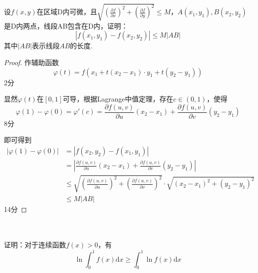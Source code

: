 \documentclass[hideanswer=false,
	enfont=newtxtext,
	zhfont=empty,
	mathfont=newtxmath,
]{cmcthesis}
\begin{document}
\\\\
设$f(x,y)$在区域D内可微，且$\sqrt{\left(\frac{\partial f}{\partial x}\right)^2+\left(\frac{\partial f}{\partial y}\right)^2}\leq M$，$A\left(x_1,y_1\right),B\left(x_2,y_2\right)$是D内两点，线段AB包含在D内，证明：
	\[
	|f\left(x_1,y_1\right)-f\left(x_2,y_2\right)|\leq M|AB|
	\]
其中$|AB|$表示线段$AB$的长度.
	\begin{answer}
	\begin{proof}
作辅助函数
	\[
	\varphi\left(t\right)=f\left(x_1+t\left(x_2-x_1\right)\cdot y_1+t\left(y_2-y_1\right)\right)
	\]
\hfill\dotfill 2分

显然$\varphi(t)$在$[0,1]$可导，根据Lagrange中值定理，存在$c\in(0,1)$，使得
	\[
	\varphi\left(1\right)-\varphi\left(0\right)=\varphi '\left(c\right)=\frac{\partial f\left(u,v\right)}{\partial u}\left(x_2-x_1\right)+\frac{\partial f\left(u,v\right)}{\partial v}\left(y_2-y_1\right)
	\]
\hfill\dotfill 8分

即可得到
\begin{align*}
	\left|\varphi\left(1\right)-\varphi\left(0\right)\right|&=\left| f\left(x_2,y_2\right)-f\left(x_1,y_1\right)\right|\\
	&=\left|\frac{\partial f\left(u,v\right)}{\partial u}\left(x_2-x_1\right)+\frac{\partial f\left(u,v\right)}{\partial v}\left(y_2-y_1\right)\right|\\
	&\leq\sqrt{\left(\frac{\partial f\left(u,v\right)}{\partial u}\right)^2+\left(\frac{\partial f\left(u,v\right)}{\partial v}\right)^2}\cdot\sqrt{\left(x_2-x_1\right)^2+\left(y_2-y_1\right)^2}\\
	&\leq M\left| AB\right|
\end{align*}
\hfill\dotfill 14分
	\end{proof}
	\end{answer}




\\\\
证明：对于连续函数$f(x)>0$，有
	\[
	\ln\int_0^1{f\left(x\right)\mathrm{d}x\geq\int_0^1{\ln f\left(x\right)\mathrm{d}x}}
	\]
\end{document}
